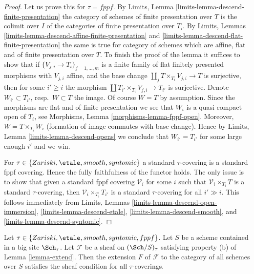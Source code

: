 \begin{proof}
Let us prove this for $\tau = fppf$.
By Limits, Lemma \ref{limits-lemma-descend-finite-presentation}
the category of schemes of finite presentation over $T$ is the
colimit over $I$ of the categories of finite presentation over $T_i$. By
Limits, Lemmas \ref{limits-lemma-descend-affine-finite-presentation}
and \ref{limits-lemma-descend-flat-finite-presentation}
the same is true for category of schemes which are affine, flat and
of finite presentation over $T$.
To finish the proof of the lemma it suffices to show that if
$\{V_{j, i} \to T_i\}_{j = 1, \ldots, m}$ is a finite family of
flat finitely presented morphisms with $V_{j, i}$ affine, and the
base change $\coprod_j T \times_{T_i} V_{j, i} \to T$ is surjective,
then for some $i' \geq i$ the morphism
$\coprod T_{i'} \times_{T_i} V_{j, i} \to T_{i'}$ is surjective.
Denote $W_{i'} \subset T_{i'}$, resp.\ $W \subset T$ the image.
Of course $W = T$ by assumption.
Since the morphisms are flat and of finite presentation we see that
$W_i$ is a quasi-compact open of $T_i$, see
Morphisms, Lemma \ref{morphisms-lemma-fppf-open}.
Moreover, $W = T \times_{T_i} W_i$ (formation of image commutes
with base change). Hence by
Limits, Lemma \ref{limits-lemma-descend-opens}
we conclude that $W_{i'} = T_{i'}$ for some large enough $i'$
and we win.

\medskip\noindent
For $\tau \in \{Zariski, \etale, smooth, syntomic\}$ a standard $\tau$-covering
is a standard fppf covering. Hence the fully faithfulness of the functor
holds. The only issue is to show that given a standard fppf covering
$\mathcal{V}_i$ for some $i$ such that $\mathcal{V}_i \times_{T_i} T$
is a standard $\tau$-covering, then $\mathcal{V}_i \times_{T_i} T_{i'}$
is a standard $\tau$-covering for all $i' \gg i$. This follows immediately
from Limits, Lemmas
\ref{limits-lemma-descend-open-immersion},
\ref{limits-lemma-descend-etale},
\ref{limits-lemma-descend-smooth}, and
\ref{limits-lemma-descend-syntomic}.
\end{proof}

\begin{lemma}
\label{lemma-extend-sheaf}
Let $\tau \in \{Zariski, \etale, smooth, syntomic, fppf\}$.
Let $S$ be a scheme contained in a big site $\Sch_\tau$.
Let $\mathcal{F}$ be a sheaf on $(\Sch/S)_\tau$ satisfying
property (b) of Lemma \ref{lemma-extend}. Then the extension
$F$ of $\mathcal{F}$ to the category of all schemes over $S$
satisfies the sheaf condition for all $\tau$-coverings.
\end{lemma}

